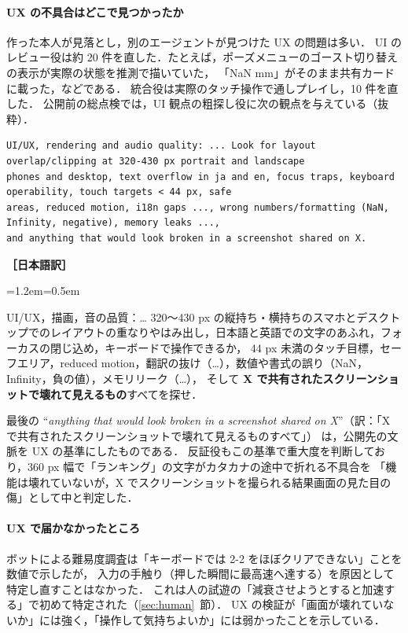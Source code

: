 \documentclass[a4paper,10pt]{ltjsarticle}
\newcommand{\secref}[1]{\ref{#1}~節}
\newenvironment{yaku}{\par\vspace{-2pt}\small\noindent\textbf{［日本語訳］}\par\nopagebreak\begin{list}{}{\leftmargin=1.2em\rightmargin=0.5em\topsep=1pt}\item\relax}{\end{list}\vspace{4pt}}
\begin{document}
\paragraph{UX の不具合はどこで見つかったか} 作った本人が見落とし，別のエージェントが見つけた UX の問題は多い．
UI のレビュー役は約 20 件を直した．たとえば，ポーズメニューのゴースト切り替えの表示が実際の状態を推測で描いていた，
「NaN mm」がそのまま共有カードに載った，などである．
統合役は実際のタッチ操作で通しプレイし，10 件を直した．
公開前の総点検では，UI 観点の粗探し役に次の観点を与えている（抜粋）．
\begin{lstlisting}[caption={総点検の UI 観点（抜粋）},label={lst:uifind}]
UI/UX, rendering and audio quality: ... Look for layout overlap/clipping at 320-430 px portrait and landscape
phones and desktop, text overflow in ja and en, focus traps, keyboard operability, touch targets < 44 px, safe
areas, reduced motion, i18n gaps ..., wrong numbers/formatting (NaN, Infinity, negative), memory leaks ...,
and anything that would look broken in a screenshot shared on X.
\end{lstlisting}
\begin{yaku}
UI/UX，描画，音の品質：…
320〜430 px の縦持ち・横持ちのスマホとデスクトップでのレイアウトの重なりやはみ出し，日本語と英語での文字のあふれ，フォーカスの閉じ込め，キーボードで操作できるか，
44 px 未満のタッチ目標，セーフエリア，reduced motion，翻訳の抜け（…），数値や書式の誤り（NaN，Infinity，負の値），メモリリーク（…），
そして \textbf{X で共有されたスクリーンショットで壊れて見えるもの}すべてを探せ．
\end{yaku}
最後の ``\textit{anything that would look broken in a screenshot shared on X}''（訳：「X で共有されたスクリーンショットで壊れて見えるものすべて」） は，公開先の文脈を UX の基準にしたものである．
反証役もこの基準で重大度を判断しており，360 px 幅で「ランキング」の文字がカタカナの途中で折れる不具合を
「機能は壊れていないが，X でスクリーンショットを撮られる結果画面の見た目の傷」として中と判定した．

\paragraph{UX で届かなかったところ} ボットによる難易度調査は「キーボードでは 2-2 をほぼクリアできない」ことを数値で示したが，
入力の手触り（押した瞬間に最高速へ達する）を原因として特定し直すことはなかった．
これは人の試遊の「減衰させようとすると加速する」で初めて特定された（\secref{sec:human}）．
UX の検証が「画面が壊れていないか」には強く，「操作して気持ちよいか」には弱かったことを示している．
\end{document}
